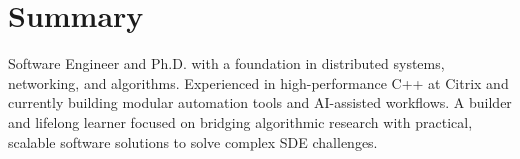 \section{Summary}


Software Engineer and Ph.D. with a foundation in distributed systems, networking, and algorithms. Experienced in high-performance C++ at Citrix and currently building modular automation tools and AI-assisted workflows. A builder and lifelong learner focused on bridging algorithmic research with practical, scalable software solutions to solve complex SDE challenges.